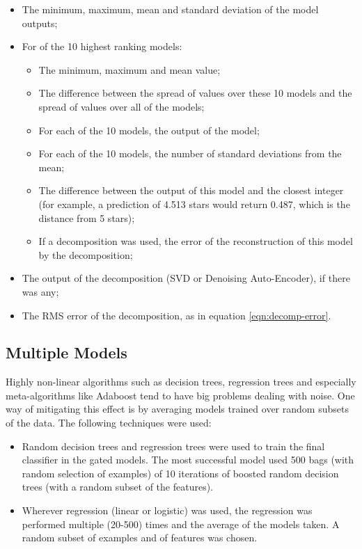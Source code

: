 \documentclass{article}
\begin{document}
\begin{itemize}
\item The minimum, maximum, mean and standard deviation of the model outputs;
\item For of the 10 highest ranking models:
  \begin{itemize}
    \item The minimum, maximum and mean value;
    \item The difference between the spread of values over these 10 models and the spread of values over all of the models;
    \item For each of the 10 models, the output of the model;
    \item For each of the 10 models, the number of standard deviations from the mean;
    \item The difference between the output of this model and the closest integer (for example, a prediction of 4.513 stars would return 0.487, which is the distance from 5 stars);
    \item If a decomposition was used, the error of the reconstruction of this model by the decomposition;
  \end{itemize}
\item The output of the decomposition (SVD or Denoising Auto-Encoder), if there was any;
\item The RMS error of the decomposition, as in equation \ref{eqn:decomp-error}.

\end{itemize}

\subsection{Multiple Models}

Highly non-linear algorithms such as decision trees, regression trees and especially meta-algorithms like Adaboost tend to have big problems dealing with noise.
One way of mitigating this effect is by averaging models trained over random subsets of the data.  The following techniques were used:

\begin{itemize}
\item Random decision trees and regression trees were used to train the final classifier in the gated models.  The most successful model used 500 bags (with random selection of examples) of 10 iterations of boosted random decision trees (with a random subset of the features).
\item Wherever regression (linear or logistic) was used, the regression was performed multiple (20-500) times and the average of the models taken.  A random subset of examples and of features was chosen.
\end{itemize}
\end{document}
